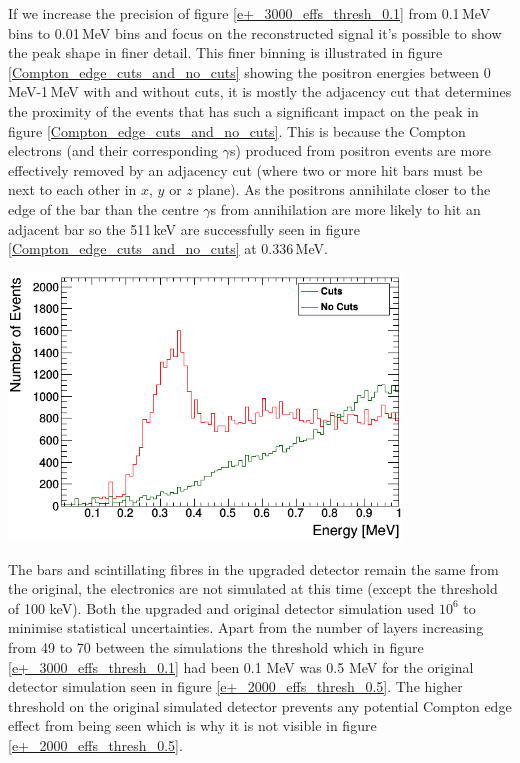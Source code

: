 \documentclass[12pt,a4paper]{article}
\newenvironment{Figure}
  {\par\medskip\noindent\minipage{\linewidth}}
  {\endminipage\par\medskip}
\begin{document}
If we increase the precision of figure \ref{e+_3000_effs_thresh_0.1} from 0.1\,MeV bins to 0.01\,MeV bins and focus on the reconstructed signal it's possible to show the peak shape in finer detail. This finer binning is illustrated in figure \ref{Compton_edge_cuts_and_no_cuts} showing the positron energies between 0\,MeV-1\,MeV with and without cuts, it is mostly the adjacency cut that determines the proximity of the events that has such a significant impact on the peak in figure \ref{Compton_edge_cuts_and_no_cuts}. This is because the Compton electrons (and their corresponding $\gamma$s) produced from positron events are more effectively removed by an adjacency cut (where two or more hit bars must be next to each other in $x$, $y$ or $z$ plane). As the positrons annihilate closer to the edge of the bar than the centre $\gamma$s from annihilation are more likely to hit an adjacent bar so the 511\,keV are successfully seen in figure \ref{Compton_edge_cuts_and_no_cuts} at 0.336\,MeV.

\begin{Figure}
 \centering
 \includegraphics[height=71mm]{compton_edge_no_and_checks.png}
 \label{Compton_edge_cuts_and_no_cuts}
\end{Figure}

The bars and scintillating fibres in the upgraded detector remain the same from the original, the electronics are not simulated at this time (except the threshold of 100 keV). Both the upgraded and original detector simulation used $10^6$ to minimise statistical uncertainties. Apart from the number of layers increasing from 49 to 70 between the simulations the threshold which in figure \ref{e+_3000_effs_thresh_0.1} had been 0.1 MeV was 0.5 MeV for the original detector simulation seen in figure \ref{e+_2000_effs_thresh_0.5}. The higher threshold on the original simulated detector prevents any potential Compton edge effect from being seen which is why it is not visible in figure \ref{e+_2000_effs_thresh_0.5}.     
\end{document}
